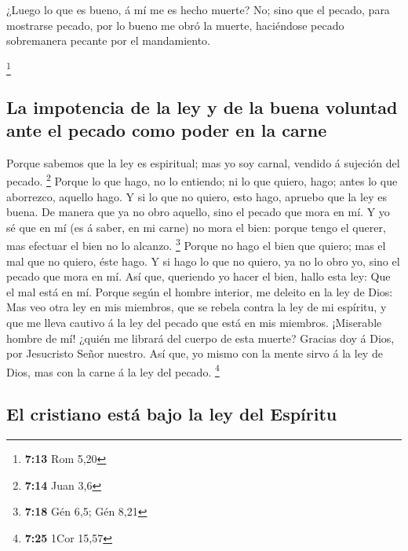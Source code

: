  ¿Luego lo que es bueno, á mí me es hecho muerte? No; sino
que el pecado, para mostrarse pecado, por lo bueno me obró la muerte,
haciéndose pecado sobremanera pecante por el mandamiento.

\footnote{\textbf{7:13} Rom 5,20}

\hypertarget{la-impotencia-de-la-ley-y-de-la-buena-voluntad-ante-el-pecado-como-poder-en-la-carne}{%
\subsection{La impotencia de la ley y de la buena voluntad ante el
pecado como poder en la
carne}\label{la-impotencia-de-la-ley-y-de-la-buena-voluntad-ante-el-pecado-como-poder-en-la-carne}}

 Porque sabemos que la ley es espiritual; mas yo soy
carnal, vendido á sujeción del pecado. \footnote{\textbf{7:14} Juan 3,6}
 Porque lo que hago, no lo entiendo; ni lo que quiero,
hago; antes lo que aborrezco, aquello hago.  Y si lo que no
quiero, esto hago, apruebo que la ley es buena.  De manera
que ya no obro aquello, sino el pecado que mora en mí.  Y
yo sé que en mí (es á saber, en mi carne) no mora el bien: porque tengo
el querer, mas efectuar el bien no lo alcanzo. \footnote{\textbf{7:18}
  Gén 6,5; Gén 8,21}  Porque no hago el bien que quiero;
mas el mal que no quiero, éste hago.  Y si hago lo que no
quiero, ya no lo obro yo, sino el pecado que mora en mí. 
Así que, queriendo yo hacer el bien, hallo esta ley: Que el mal está en
mí.  Porque según el hombre interior, me deleito en la ley
de Dios:  Mas veo otra ley en mis miembros, que se rebela
contra la ley de mi espíritu, y que me lleva cautivo á la ley del pecado
que está en mis miembros.  ¡Miserable hombre de mí! ¿quién
me librará del cuerpo de esta muerte?  Gracias doy á Dios,
por Jesucristo Señor nuestro. Así que, yo mismo con la mente sirvo á la
ley de Dios, mas con la carne á la ley del pecado. \footnote{\textbf{7:25}
  1Cor 15,57}

\hypertarget{el-cristiano-estuxe1-bajo-la-ley-del-espuxedritu}{%
\subsection{El cristiano está bajo la ley del
Espíritu}\label{el-cristiano-estuxe1-bajo-la-ley-del-espuxedritu}}

